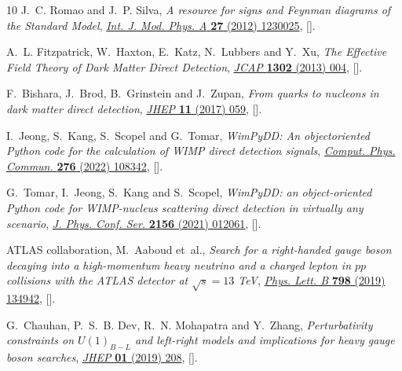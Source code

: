 \documentclass[11pt]{article}
\begin{document}
\begin{thebibliography}{10}
J.~C. Romao and J.~P. Silva, \emph{{A resource for signs and Feynman diagrams
  of the Standard Model}},
  \href{https://doi.org/10.1142/S0217751X12300256}{\emph{Int. J. Mod. Phys. A}
  {\bfseries 27} (2012) 1230025},
  [\href{https://arxiv.org/abs/1209.6213}{{}}].

A.~L. Fitzpatrick, W.~Haxton, E.~Katz, N.~Lubbers and Y.~Xu, \emph{{The
  Effective Field Theory of Dark Matter Direct Detection}},
  \href{https://doi.org/10.1088/1475-7516/2013/02/004}{\emph{JCAP} {\bfseries
  1302} (2013) 004}, [\href{https://arxiv.org/abs/1203.3542}{{}}].

F.~Bishara, J.~Brod, B.~Grinstein and J.~Zupan, \emph{{From quarks to nucleons
  in dark matter direct detection}},
  \href{https://doi.org/10.1007/JHEP11(2017)059}{\emph{JHEP} {\bfseries 11}
  (2017) 059}, [\href{https://arxiv.org/abs/1707.06998}{{}}].

I.~Jeong, S.~Kang, S.~Scopel and G.~Tomar, \emph{{WimPyDD: An
  object\textendash{}oriented Python code for the calculation of WIMP direct
  detection signals}},
  \href{https://doi.org/10.1016/j.cpc.2022.108342}{\emph{Comput. Phys. Commun.}
  {\bfseries 276} (2022) 108342},
  [\href{https://arxiv.org/abs/2106.06207}{{}}].

G.~Tomar, I.~Jeong, S.~Kang and S.~Scopel, \emph{{WimPyDD: an object-oriented
  Python code for WIMP-nucleus scattering direct detection in virtually any
  scenario}}, \href{https://doi.org/10.1088/1742-6596/2156/1/012061}{\emph{J.
  Phys. Conf. Ser.} {\bfseries 2156} (2021) 012061},
  [\href{https://arxiv.org/abs/2110.11086}{{}}].

{\scshape ATLAS} collaboration, M.~Aaboud et~al., \emph{{Search for a
  right-handed gauge boson decaying into a high-momentum heavy neutrino and a
  charged lepton in $pp$ collisions with the ATLAS detector at $\sqrt{s}=13$
  TeV}}, \href{https://doi.org/10.1016/j.physletb.2019.134942}{\emph{Phys.
  Lett. B} {\bfseries 798} (2019) 134942},
  [\href{https://arxiv.org/abs/1904.12679}{{}}].

G.~Chauhan, P.~S.~B. Dev, R.~N. Mohapatra and Y.~Zhang, \emph{{Perturbativity
  constraints on $U(1)_{B-L}$ and left-right models and implications for heavy
  gauge boson searches}},
  \href{https://doi.org/10.1007/JHEP01(2019)208}{\emph{JHEP} {\bfseries 01}
  (2019) 208}, [\href{https://arxiv.org/abs/1811.08789}{{}}].


\end{thebibliography}
\end{document}
